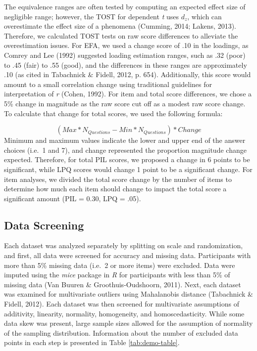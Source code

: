 \documentclass[english,man, mask]{apa6}
\theoremstyle{definition}
\theoremstyle{definition}
\theoremstyle{definition}
\theoremstyle{remark}
\begin{document}
The equivalence ranges are often tested by computing an expected effect
size of negligible range; however, the TOST for dependent \emph{t} uses
\(d_z\), which can overestimate the effect size of a phenomena (Cumming,
2014; Lakens, 2013). Therefore, we calculated TOST tests on raw score
differences to alleviate the overestimation issues. For EFA, we used a
change score of .10 in the loadings, as Comrey and Lee (1992) suggested
loading estimation ranges, such as .32 (poor) to .45 (fair) to .55
(good), and the differences in these ranges are approximately .10 (as
cited in Tabachnick \& Fidell, 2012, p. 654). Additionally, this score
would amount to a small correlation change using traditional guidelines
for interpretation of \emph{r} (Cohen, 1992). For item and total score
differences, we chose a 5\% change in magnitude as the raw score cut off
as a modest raw score change. To calculate that change for total scores,
we used the following formula:

\[
(Max*N_{Questions} - Min*N_{Questions}) * Change
\] Minimum and maximum values indicate the lower and upper end of the
answer choices (i.e.~1 and 7), and change represented the proportion
magnitude change expected. Therefore, for total PIL scores, we proposed
a change in 6 points to be significant, while LPQ scores would change 1
point to be a significant change. For item analyses, we divided the
total score change by the number of items to determine how much each
item should change to impact the total score a significant amount (PIL =
0.30, LPQ = .05).

\subsection{Data Screening}\label{data-screening}

Each dataset was analyzed separately by splitting on scale and
randomization, and first, all data were screened for accuracy and
missing data. Participants with more than 5\% missing data (i.e.~2 or
more items) were excluded. Data were imputed using the \emph{mice}
package in \emph{R} for participants with less than 5\% of missing data
(Van Buuren \& Groothuis-Oudshoorn, 2011). Next, each dataset was
examined for multivariate outliers using Mahalanobis distance
(Tabachnick \& Fidell, 2012). Each dataset was then screened for
multivariate assumptions of additivity, linearity, normality,
homogeneity, and homoscedasticity. While some data skew was present,
large sample sizes allowed for the assumption of normality of the
sampling distribution. Information about the number of excluded data
points in each step is presented in Table \ref{tab:demo-table}.
\end{document}
